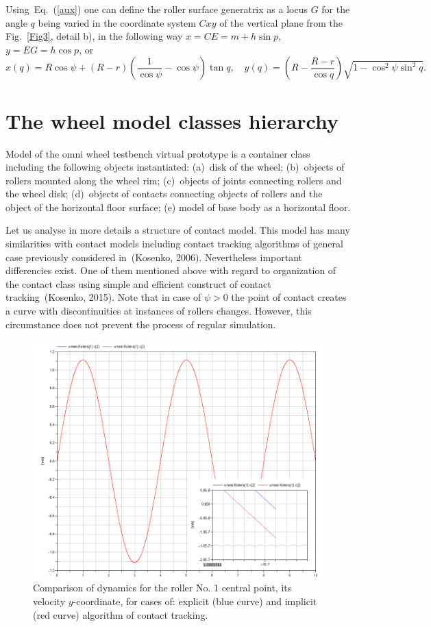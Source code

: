\documentclass{jsme-tj}
\newcommand{\Frac}[2]{\frac{\displaystyle #1}{\displaystyle #2}}
\begin{document}
Using~Eq.~(\ref{aux}) one can define the roller surface generatrix as a locus 
$G$ for the angle $q$ being varied in the coordinate system $Cxy$ of the 
vertical plane from the Fig.~\ref{Fig3}, detail b), in the following way 
$x=CE=m+h\sin p$, $y=EG=h\cos p$, or
$$
x(q)=R\cos\psi +(R-r)\left(\Frac{1}{\cos\psi }-\cos\psi\right)\tan q,\quad
y(q)=\left(R-\Frac{R-r}{\cos q}\right)\sqrt{1-\cos ^2\psi\sin ^2q}.
$$

\section{The wheel model classes hierarchy}

Model of the omni wheel testbench virtual prototype is a container class 
including the following objects instantiated: (a)~disk of the wheel; 
(b)~objects of rollers mounted along the wheel rim; (c)~objects of joints
connecting rollers and the wheel disk; (d)~objects of contacts connecting 
objects of rollers and the object of the horizontal floor surface; (e) model of
base body as a horizontal floor.

Let us analyse in more details a structure of contact model. This model has
many similarities with contact models including contact tracking algorithms of
general case previously considered in~(Kosenko, 2006). Nevertheless important 
differencies exist. One of them mentioned above with regard to organization of 
the contact class using simple and efficient construct of contact 
tracking~(Kosenko, 2015). Note that in case of $\psi >0$ the point of contact 
creates a curve with discontinuities at instances of rollers changes. However, 
this circumstance does not prevent the process of regular simulation.

\begin{figure}[h]
\centerline{\includegraphics[bb= 0 0 19.50cm 16cm,scale=0.75]{VelocityDiverg.png}}
\caption{Comparison of dynamics for the roller No. 1 central point, its 
velocity $y$-coordinate, for cases of: explicit (blue curve) and implicit (red 
curve) algorithm of contact tracking.}
\label{figure5}
\end{figure}
\end{document}
